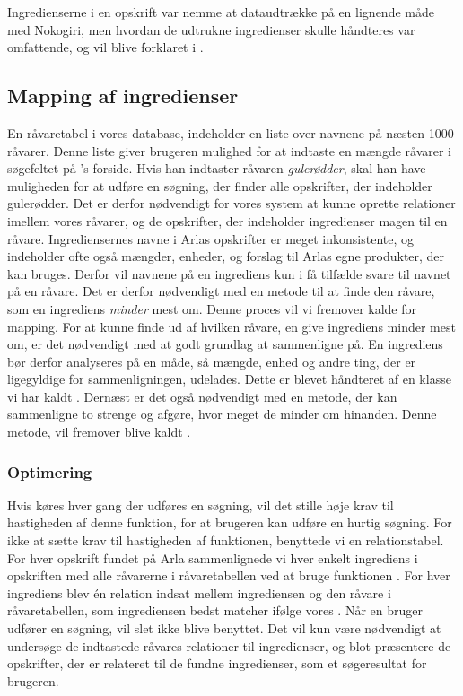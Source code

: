 Ingredienserne i en opskrift var nemme at dataudtrække på en lignende måde med Nokogiri, men hvordan de udtrukne ingredienser skulle håndteres var omfattende, og vil blive forklaret i .

\subsection{Mapping af ingredienser}
\label{sec:mapping}
En råvaretabel i vores database, indeholder en liste over navnene på næsten 1000 råvarer. Denne liste giver brugeren mulighed for at indtaste en mængde råvarer i søgefeltet på {\Foodl}'s forside. Hvis han indtaster råvaren \textit{gulerødder}, skal han have muligheden for at udføre en søgning, der finder alle opskrifter, der indeholder gulerødder. Det er derfor nødvendigt for vores system at kunne oprette relationer imellem vores råvarer, og de opskrifter, der indeholder ingredienser magen til en råvare. Ingrediensernes navne i Arlas opskrifter er meget inkonsistente, og indeholder ofte også mængder, enheder, og forslag til Arlas egne produkter, der kan bruges. Derfor vil navnene på en ingrediens kun i få tilfælde svare til navnet på en råvare. Det er derfor nødvendigt med en metode til at finde den råvare, som en ingrediens \textit{minder} mest om. Denne proces vil vi fremover kalde for mapping. For at kunne finde ud af hvilken råvare, en give ingrediens minder mest om, er det nødvendigt med at godt grundlag at sammenligne på. En ingrediens bør derfor analyseres på en måde, så mængde, enhed og andre ting, der er ligegyldige for sammenligningen, udelades. Dette er blevet håndteret af en klasse vi har kaldt . Dernæst er det også nødvendigt med en metode, der kan sammenligne to strenge og afgøre, hvor meget de minder om hinanden. Denne metode, vil fremover blive kaldt .

\subsubsection{Optimering}
Hvis  køres hver gang der udføres en søgning, vil det stille høje krav til hastigheden af denne funktion, for at brugeren kan udføre en hurtig søgning. For ikke at sætte krav til hastigheden af funktionen, benyttede vi en relationstabel. For hver opskrift fundet på Arla sammenlignede vi hver enkelt ingrediens i opskriften med alle råvarerne i råvaretabellen ved at bruge funktionen . For hver ingrediens blev én relation indsat mellem ingrediensen og den råvare i råvaretabellen, som ingrediensen bedst matcher ifølge vores . Når en bruger udfører en søgning, vil  slet ikke blive benyttet. Det vil kun være nødvendigt at undersøge de indtastede råvares relationer til ingredienser, og blot præsentere de opskrifter, der er relateret til de fundne ingredienser, som et søgeresultat for brugeren.

